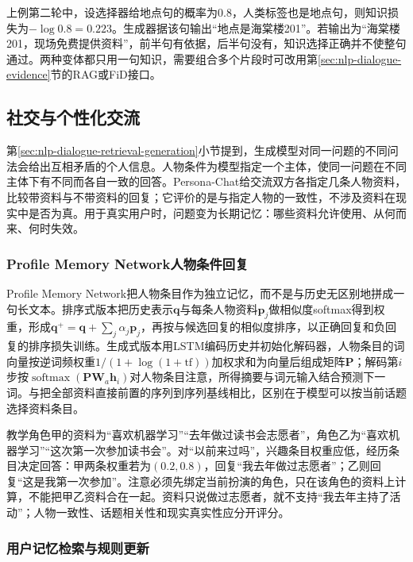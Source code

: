 上例第二轮中，设选择器给地点句的概率为0.8，人类标签也是地点句，则知识损失为$-\log0.8=0.223$。生成器据该句输出“地点是海棠楼201”。若输出为“海棠楼201，现场免费提供资料”，前半句有依据，后半句没有，知识选择正确并不使整句通过。两种变体都只用一句知识，需要组合多个片段时可改用第\ref{sec:nlp-dialogue-evidence}节的RAG或FiD接口。

\subsection{社交与个性化交流}
\label{sec:nlp-dialogue-personalization}

第\ref{sec:nlp-dialogue-retrieval-generation}小节提到，生成模型对同一问题的不同问法会给出互相矛盾的个人信息。人物条件为模型指定一个主体，使同一问题在不同主体下有不同而各自一致的回答。Persona-Chat给交流双方各指定几条人物资料，比较带资料与不带资料的回复；它评价的是与指定人物的一致性，不涉及资料在现实中是否为真。用于真实用户时，问题变为长期记忆：哪些资料允许使用、从何而来、何时失效。

\subsubsection{Profile Memory Network人物条件回复}
\label{sec:nlp-dialogue-profile-memory}

Profile Memory Network把人物条目作为独立记忆，而不是与历史无区别地拼成一句长文本。排序式版本把历史表示$\bm{q}$与每条人物资料$\bm{p}_j$做相似度softmax得到权重，形成$\bm{q}^{+}=\bm{q}+\sum_j\alpha_j\bm{p}_j$，再按与候选回复的相似度排序，以正确回复和负回复的排序损失训练。生成式版本用LSTM编码历史并初始化解码器，人物条目的词向量按逆词频权重$1/(1+\log(1+\mathrm{tf}))$加权求和为向量后组成矩阵$\bm{P}$；解码第$i$步按$\operatorname{softmax}(\bm{P}\bm{W}_a\bm{h}_i)$对人物条目注意，所得摘要与词元输入结合预测下一词。与把全部资料直接前置的序列到序列基线相比，区别在于模型可以按当前话题选择资料条目。

教学角色甲的资料为“喜欢机器学习”“去年做过读书会志愿者”，角色乙为“喜欢机器学习”“这次第一次参加读书会”。对“以前来过吗”，兴趣条目权重应低，经历条目决定回答：甲两条权重若为$(0.2,0.8)$，回复“我去年做过志愿者”；乙则回复“这是我第一次参加”。注意必须先绑定当前扮演的角色，只在该角色的资料上计算，不能把甲乙资料合在一起。资料只说做过志愿者，就不支持“我去年主持了活动”；人物一致性、话题相关性和现实真实性应分开评分。

\subsubsection{用户记忆检索与规则更新}
\label{sec:nlp-dialogue-user-memory}

